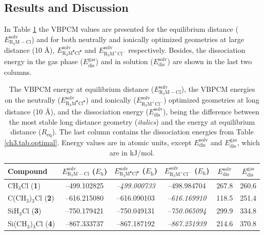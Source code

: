 \subsection{Results and Discussion}

In Table \ref{ch3.tab.solution} the VBPCM values are presented for the equilibrium distance ($E_\mathrm{R_{3}M-Cl}^\mathrm{solv}$) and for both neutrally and ionically optimized geometries at large distance (10 \AA), $E_\mathrm{R_{3}M^\bullet Cl^\bullet}^\mathrm{solv}$ and $E_\mathrm{R_{3}M^{+} Cl^{-}}^\mathrm{solv}$ respectively. Besides, the dissociation energy in the gas phase ($E_\mathrm{dis}^\mathrm{gas}$) and in solution ($E_\mathrm{dis}^\mathrm{solv}$) are shown in the last two columns.
\begin{table}[htp]
\center
\caption{The VBPCM energy at equilibrium distance ($E_\mathrm{R_{3}M-Cl}^\mathrm{solv}$), the VBPCM energies on the neutrally ($E_\mathrm{R_{3}M^\bullet Cl^\bullet}^\mathrm{solv}$) and ionically ($E_\mathrm{R_{3}M^{+} Cl^{-}}^\mathrm{solv}$) optimized geometries at long distance (10 \AA), and the dissociation energy ($E_\mathrm{dis}^\mathrm{solv}$), being the difference between the most stable long distance geometry (\textit{italics}) and the energy at equilibrium distance ($R_\mathrm{eq}$). The last column contains the dissociation energies from Table \ref{ch3.tab.optimal}. Energy values are in atomic units, except $E_\mathrm{dis}^\mathrm{solv}$ and $E_\mathrm{dis}^\mathrm{gas}$, which are in kJ/mol.}
\begin{tabular}{|l|c|c|c|c|c|}
\hline
\textbf{Compound} & $E_\mathrm{R_{3}M-Cl}^\mathrm{solv}$ ($E_{\mathrm{h}}$) & $E_\mathrm{R_{3}M^\bullet Cl^\bullet}^\mathrm{solv}$ ($E_{\mathrm{h}}$) & $E_\mathrm{R_{3}M^{+} Cl^{-}}^\mathrm{solv}$ ($E_{\mathrm{h}}$) & $E_\mathrm{dis}^\mathrm{solv}$&
$E_\mathrm{dis}^\mathrm{gas}$\\
\hline
CH$_3$Cl (\textbf{1})& --499.102825 & \textit{--499.000733} & --498.984704 & 267.8 & 260.6 \\
C(CH$_3$)$_3$Cl (\textbf{2})& --616.215080 & --616.090103 & \textit{--616.169910} & 118.5 & 251.4 \\
SiH$_3$Cl (\textbf{3})& --750.179421& --750.049131 & \textit{--750.065094} &  299.9 & 334.8 \\
Si(CH$_3$)$_3$Cl (\textbf{4})& --867.333737 & --867.187192 & \textit{--867.251939} & 214.6 & 370.8 \\
\hline
\end{tabular}
\label{ch3.tab.solution}
\end{table} 

